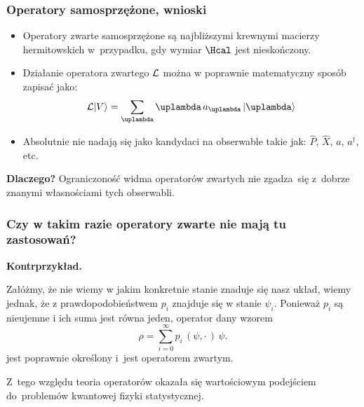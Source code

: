 \documentclass[10pt,t]{beamer}
\begin{document}
\begin{frame}
  \frametitle{Operatory samosprzężone, wnioski}


  \begin{itemize}
    \RaggedRight

  \item Operatory zwarte samosprzężone są najbliższymi krewnymi macierzy
    hermitowskich w~przypadku, gdy wymiar $\Hcal$ jest nieskończony.

  \item Działanie operatora zwartego $\mathcal{L}$ można w poprawnie matematyczny
    sposób zapisać jako:
    \begin{equation}
      \label{eq:Matematyczna-strona-03}
      \Lcal | V \rangle = \sum_{ \lambda } \lambda \, a_{ \lambda } \, | \lambda \rangle
    \end{equation}

  \item Absolutnie nie nadają się jako kandydaci na obserwable takie jak:
    $\widehat{ P }$, $\widehat{ X }$, $a$, $a^{ \dagger }$, etc.

  \end{itemize}

  \textbf{Dlaczego?} Ograniczoność widma operatorów zwartych nie zgadza~się
  z~dobrze znanymi własnościami tych obserwabli.

\end{frame}





\begin{frame}
  \frametitle{Czy w takim razie operatory zwarte nie mają tu zastosowań?}


  \textbf{Kontrprzykład.}

  Załóżmy, że nie wiemy w jakim konkretnie stanie znaduje się nasz układ,
  wiemy jednak, że z prawdopodobieństwem $p_{ i }$ znajduje się w stanie
  $\psi_{ i }$. Ponieważ $p_{ i }$ są nieujemne i ich suma jest równa jeden,
  operator dany wzorem
  \begin{equation}
    \label{eq:Matematyczna-strona-04}
    \rho = \sum_{ i = 0 }^{ \infty } p_ { i } \, ( \psi, \cdot \, ) \, \psi.
  \end{equation}
  jest poprawnie określony i~jest operatorem zwartym.

  Z~tego względu teoria operatorów okazała się wartościowym podejściem
  do~problemów kwantowej fizyki statystycznej.

\end{frame}
\end{document}
